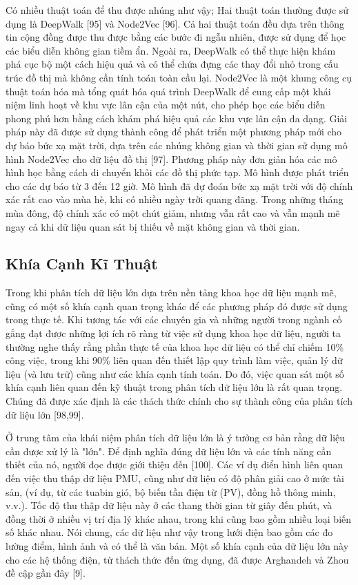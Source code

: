 \documentclass[utf8]{frontiersSCNS} %
\begin{document}
Có nhiều thuật toán để thu được nhúng như vậy; Hai thuật toán thường được sử dụng là DeepWalk [95] và Node2Vec [96]. Cả hai thuật toán đều dựa trên thông tin cộng đồng được thu được bằng các bước đi ngẫu nhiên, được sử dụng để học các biểu diễn không gian tiềm ẩn. Ngoài ra, DeepWalk có thể thực hiện khám phá cục bộ một cách hiệu quả và có thể chứa đựng các thay đổi nhỏ trong cấu trúc đồ thị mà không cần tính toán toàn cầu lại. Node2Vec là một khung công cụ thuật toán hóa mà tổng quát hóa quá trình DeepWalk để cung cấp một khái niệm linh hoạt về khu vực lân cận của một nút, cho phép học các biểu diễn phong phú hơn bằng cách khám phá hiệu quả các khu vực lân cận đa dạng. Giải pháp này đã được sử dụng thành công để phát triển một phương pháp mới cho dự báo bức xạ mặt trời, dựa trên các nhúng không gian và thời gian sử dụng mô hình Node2Vec cho dữ liệu đồ thị [97]. Phương pháp này đơn giản hóa các mô hình học bằng cách di chuyển khỏi các đồ thị phức tạp. Mô hình được phát triển cho các dự báo từ 3 đến 12 giờ. Mô hình đã dự đoán bức xạ mặt trời với độ chính xác rất cao vào mùa hè, khi có nhiều ngày trời quang đãng. Trong những tháng mùa đông, độ chính xác có một chút giảm, nhưng vẫn rất cao và vẫn mạnh mẽ ngay cả khi dữ liệu quan sát bị thiếu về mặt không gian và thời gian.


\subsection{Khía Cạnh Kĩ Thuật}
Trong khi phân tích dữ liệu lớn dựa trên nền tảng khoa học dữ liệu mạnh mẽ, cũng có một số khía cạnh quan trọng khác để các phương pháp đó được sử dụng trong thực tế. Khi tương tác với các chuyên gia và những người trong ngành cố gắng đạt được những lợi ích rõ ràng từ việc sử dụng khoa học dữ liệu, người ta thường nghe thấy rằng phần thực tế của khoa học dữ liệu có thể chỉ chiếm 10\% công việc, trong khi 90\% liên quan đến thiết lập quy trình làm việc, quản lý dữ liệu (và lưu trữ) cũng như các khía cạnh tính toán. Do đó, việc quan sát một số khía cạnh liên quan đến kỹ thuật trong phân tích dữ liệu lớn là rất quan trọng. Chúng đã được xác định là các thách thức chính cho sự thành công của phân tích dữ liệu lớn [98,99].

Ở trung tâm của khái niệm phân tích dữ liệu lớn là ý tưởng cơ bản rằng dữ liệu cần được xử lý là "lớn". Để định nghĩa đúng dữ liệu lớn và các tính năng cần thiết của nó, người đọc được giới thiệu đến [100]. Các ví dụ điển hình liên quan đến việc thu thập dữ liệu PMU, cũng như dữ liệu có độ phân giải cao ở mức tài sản, (ví dụ, từ các tuabin gió, bộ biến tần điện từ (PV), đồng hồ thông minh, v.v.). Tốc độ thu thập dữ liệu này ở các thang thời gian từ giây đến phút, và đồng thời ở nhiều vị trí địa lý khác nhau, trong khi cũng bao gồm nhiều loại biến số khác nhau. Nói chung, các dữ liệu như vậy trong lưới điện bao gồm các đo lường điểm, hình ảnh và có thể là văn bản. Một số khía cạnh của dữ liệu lớn này cho các hệ thống điện, từ thách thức đến ứng dụng, đã được Arghandeh và Zhou đề cập gần đây [9].
\end{document}
